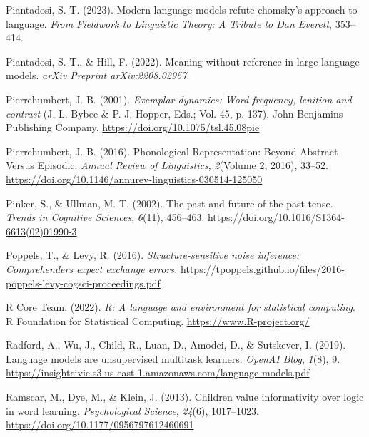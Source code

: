 \documentclass[
  12pt,
  letterpaper,
]{scrreport}
\newlength{\cslhangindent}
\newenvironment{CSLReferences}[2] %
 {\begin{list}{}{%
  \setlength{\itemindent}{0pt}
  \setlength{\leftmargin}{0pt}
  \setlength{\parsep}{0pt}
  \ifodd #1
   \setlength{\leftmargin}{\cslhangindent}
   \setlength{\itemindent}{-1\cslhangindent}
  \fi
  \setlength{\itemsep}{#2\baselineskip}}}
 {\end{list}}
\begin{document}
\begin{CSLReferences}{1}{0}
Piantadosi, S. T. (2023). Modern language models refute chomsky's
approach to language. \emph{From Fieldwork to Linguistic Theory: A
Tribute to Dan Everett}, 353--414.

Piantadosi, S. T., \& Hill, F. (2022). Meaning without reference in
large language models. \emph{arXiv Preprint arXiv:2208.02957}.

Pierrehumbert, J. B. (2001). \emph{Exemplar dynamics: Word frequency,
lenition and contrast} (J. L. Bybee \& P. J. Hopper, Eds.; Vol. 45, p.
137). John Benjamins Publishing Company.
\url{https://doi.org/10.1075/tsl.45.08pie}

Pierrehumbert, J. B. (2016). Phonological Representation: Beyond
Abstract Versus Episodic. \emph{Annual Review of Linguistics},
\emph{2}(Volume 2, 2016), 33--52.
\url{https://doi.org/10.1146/annurev-linguistics-030514-125050}

Pinker, S., \& Ullman, M. T. (2002). The past and future of the past
tense. \emph{Trends in Cognitive Sciences}, \emph{6}(11), 456--463.
\url{https://doi.org/10.1016/S1364-6613(02)01990-3}

Poppels, T., \& Levy, R. (2016). \emph{Structure-sensitive noise
inference: Comprehenders expect exchange errors.}
\url{https://tpoppels.github.io/files/2016-poppels-levy-cogsci-proceedings.pdf}

R Core Team. (2022). \emph{R: A language and environment for statistical
computing}. R Foundation for Statistical Computing.
\url{https://www.R-project.org/}

Radford, A., Wu, J., Child, R., Luan, D., Amodei, D., \& Sutskever, I.
(2019). Language models are unsupervised multitask learners.
\emph{OpenAI Blog}, \emph{1}(8), 9.
\url{https://insightcivic.s3.us-east-1.amazonaws.com/language-models.pdf}

Ramscar, M., Dye, M., \& Klein, J. (2013). Children value informativity
over logic in word learning. \emph{Psychological Science}, \emph{24}(6),
1017--1023. \url{https://doi.org/10.1177/0956797612460691}


\end{CSLReferences}
\end{document}
